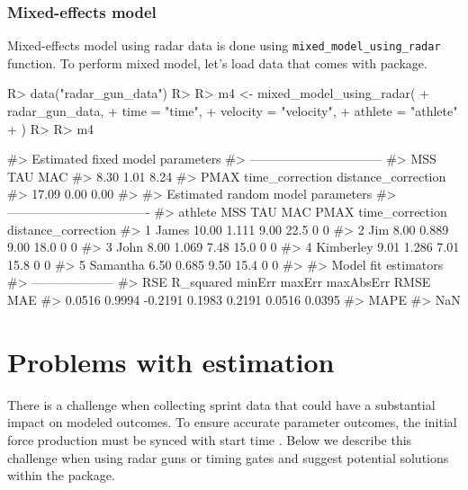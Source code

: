 \documentclass[
]{jss}
\begin{document}
\hypertarget{mixed-effects-model-1}{%
\subsubsection{Mixed-effects model}\label{mixed-effects-model-1}}

Mixed-effects model using radar data is done using \texttt{mixed\_model\_using\_radar} function. To perform mixed model, let's load data that comes with  package.

\begin{CodeChunk}
\begin{CodeInput}
R> data("radar_gun_data")
R> 
R> m4 <- mixed_model_using_radar(
+   radar_gun_data,
+   time = "time",
+   velocity = "velocity",
+   athlete = "athlete"
+ )
R> 
R> m4
\end{CodeInput}
\begin{CodeOutput}
#> Estimated fixed model parameters
#> --------------------------------
#>                 MSS                 TAU                 MAC 
#>                8.30                1.01                8.24 
#>                PMAX     time_correction distance_correction 
#>               17.09                0.00                0.00 
#> 
#> Estimated random model parameters
#> ----------------------------------
#>     athlete   MSS   TAU  MAC PMAX time_correction distance_correction
#> 1     James 10.00 1.111 9.00 22.5               0                   0
#> 2       Jim  8.00 0.889 9.00 18.0               0                   0
#> 3      John  8.00 1.069 7.48 15.0               0                   0
#> 4 Kimberley  9.01 1.286 7.01 15.8               0                   0
#> 5  Samantha  6.50 0.685 9.50 15.4               0                   0
#> 
#> Model fit estimators
#> --------------------
#>       RSE R_squared    minErr    maxErr maxAbsErr      RMSE       MAE 
#>    0.0516    0.9994   -0.2191    0.1983    0.2191    0.0516    0.0395 
#>      MAPE 
#>       NaN
\end{CodeOutput}
\end{CodeChunk}

\hypertarget{problems-with-estimation}{%
\section{Problems with estimation}\label{problems-with-estimation}}

There is a challenge when collecting sprint data that could have a substantial impact on modeled outcomes. To ensure accurate parameter outcomes, the initial force production must be synced with start time \citep{haugenPowerForceVelocityProfilingSprinting2020, haugenSprintMechanicalVariables2019}. Below we describe this challenge when using radar guns or timing gates and suggest potential solutions within the  package.
\end{document}
